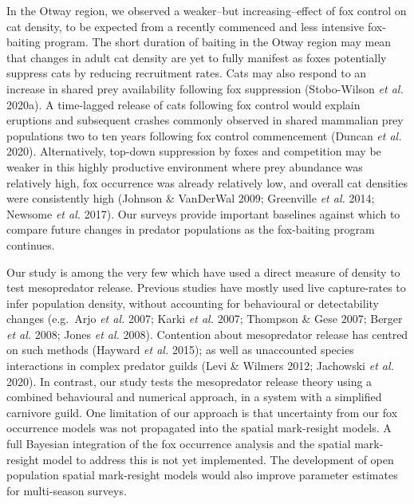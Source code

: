 \documentclass[11pt,a4paper,titlepage,twoside,openright]{style/unimelbthesis}
\begin{document}
\begin{mainmatter}
In the Otway region, we observed a weaker--but increasing--effect of fox control on cat density, to be expected from a recently commenced and less intensive fox-baiting program. The short duration of baiting in the Otway region may mean that changes in adult cat density are yet to fully manifest as foxes potentially suppress cats by reducing recruitment rates. Cats may also respond to an increase in shared prey availability following fox suppression (Stobo-Wilson \emph{et al.} 2020a). A time-lagged release of cats following fox control would explain eruptions and subsequent crashes commonly observed in shared mammalian prey populations two to ten years following fox control commencement (Duncan \emph{et al.} 2020). Alternatively, top-down suppression by foxes and competition may be weaker in this highly productive environment where prey abundance was relatively high, fox occurrence was already relatively low, and overall cat densities were consistently high (Johnson \& VanDerWal 2009; Greenville \emph{et al.} 2014; Newsome \emph{et al.} 2017). Our surveys provide important baselines against which to compare future changes in predator populations as the fox-baiting program continues.

Our study is among the very few which have used a direct measure of density to test mesopredator release. Previous studies have mostly used live capture-rates to infer population density, without accounting for behavioural or detectability changes (e.g.~Arjo \emph{et al.} 2007; Karki \emph{et al.} 2007; Thompson \& Gese 2007; Berger \emph{et al.} 2008; Jones \emph{et al.} 2008). Contention about mesopredator release has centred on such methods (Hayward \emph{et al.} 2015); as well as unaccounted species interactions in complex predator guilds (Levi \& Wilmers 2012; Jachowski \emph{et al.} 2020). In contrast, our study tests the mesopredator release theory using a combined behavioural and numerical approach, in a system with a simplified carnivore guild. One limitation of our approach is that uncertainty from our fox occurrence models was not propagated into the spatial mark-resight models. A full Bayesian integration of the fox occurrence analysis and the spatial mark-resight model to address this is not yet implemented. The development of open population spatial mark-resight models would also improve parameter estimates for multi-season surveys.


\end{mainmatter}
\end{document}
